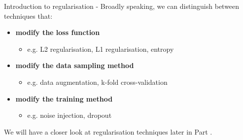 \begin{frame}[t,allowframebreaks]{Introduction to regularisation -}
Broadly speaking, we can distinguish between techniques that:\\
\vspace{0.1cm}
\begin{itemize}
    \item 
    {\bf modify the \gls{loss function}}
    \begin{itemize}
        \item e.g. L2 \gls{regularisation}, L1 \gls{regularisation}, entropy
    \end{itemize}
    \vspace{0.1cm}
    \item
    {\bf modify the data sampling method}
    \begin{itemize}
        \item e.g. data augmentation, k-fold cross-validation
    \end{itemize}
    \vspace{0.1cm}
    \item
    {\bf modify the training method}
    \begin{itemize}
        \item e.g. noise injection, dropout
    \end{itemize}
\end{itemize}

\vspace{0.3cm}

We will have a closer look at \gls{regularisation} 
techniques later in Part {\thispart}.\\

\end{frame}